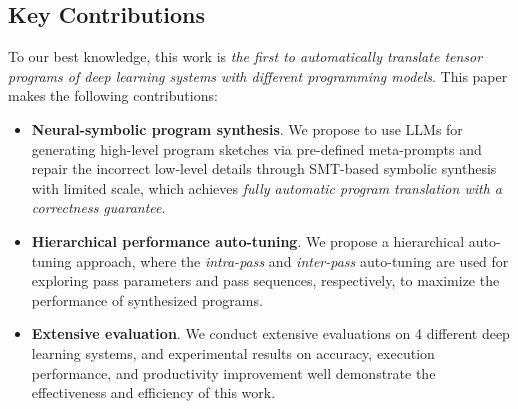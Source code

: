 \subsection{Key Contributions}
To our best knowledge, this work is \emph{the first to automatically translate tensor programs of deep learning systems with different programming models}. This paper makes the following contributions:
\begin{itemize}

\item {\textbf{Neural-symbolic program synthesis}}. We propose to use LLMs for generating high-level program sketches via pre-defined meta-prompts and repair the incorrect low-level details through SMT-based symbolic synthesis with limited scale, which achieves \emph{fully automatic program translation with a correctness guarantee}.

\item{\textbf{Hierarchical performance auto-tuning}}. We propose a hierarchical auto-tuning approach, where the \emph{intra-pass} and \emph{inter-pass} auto-tuning are used for exploring pass parameters and pass sequences, respectively, to maximize the performance of synthesized programs.



\item{\textbf{Extensive evaluation}}. We conduct extensive evaluations on 4 different deep learning systems, and experimental results on accuracy, execution performance, and productivity improvement well demonstrate the effectiveness and efficiency of this work.

\end{itemize}